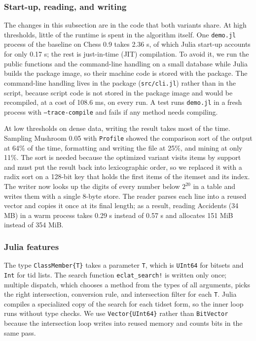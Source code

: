 \subsubsection{Start-up, reading, and writing}
The changes in this subsection are in the code that both variants share. At high
thresholds, little of the runtime is spent in the algorithm itself. One \texttt{demo.jl}
process of the baseline on Chess 0.9 takes 2.36 s, of which Julia start-up accounts for
only 0.17 s; the rest is just-in-time (JIT) compilation. To avoid it, we run the public
functions and the command-line handling on a small database while Julia builds the
package image, so their machine code is stored with the package. The command-line
handling lives in the package (\texttt{src/cli.jl}) rather than in the script, because
script code is not stored in the package image and would be recompiled, at a cost of
108.6 ms, on every run. A test runs \texttt{demo.jl} in a fresh process with
\texttt{--trace-compile} and fails if any method needs compiling.

At low thresholds on dense data, writing the result takes most of the time. Sampling
Mushroom 0.05 with \texttt{Profile} showed the comparison sort of the output at 64\% of
the time, formatting and writing the file at 25\%, and mining at only 11\%. The sort is
needed because the optimized variant visits items by support and must put the result
back into lexicographic order, so we replaced it with a radix sort on a 128-bit key that
holds the first items of the itemset and its index. The writer now looks up the digits of
every number below $2^{20}$ in a table and writes them with a single 8-byte store. The
reader parses each line into a reused vector and copies it once at its final length; as
a result, reading Accidents (34 MB) in a warm process takes 0.29 s instead of 0.57 s and
allocates 151 MiB instead of 354 MiB.

\subsubsection{Julia features}
The type \texttt{ClassMember\{T\}} takes a parameter \texttt{T}, which is \texttt{UInt64}
for bitsets and \texttt{Int} for tid lists. The search function \texttt{eclat\_search!}
is written only once; multiple dispatch, which chooses a method from the types of all
arguments, picks the right intersection, conversion rule, and intersection filter for
each \texttt{T}. Julia compiles a specialized copy of the search for each tidset form, so
the inner loop runs without type checks. We use \texttt{Vector\{UInt64\}} rather than
\texttt{BitVector} because the intersection loop writes into reused memory and counts
bits in the same pass.

